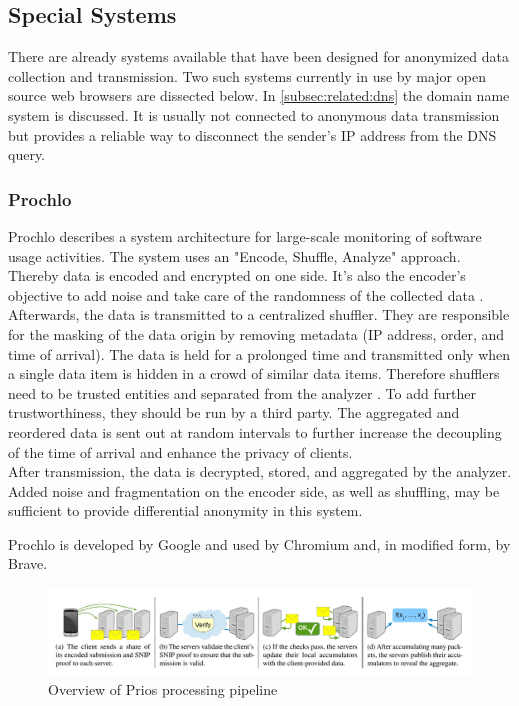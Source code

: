     \subsection{Special Systems}
        \label{subsec:related:special}
        There are already systems available that have been designed for anonymized data collection and transmission. 
        Two such systems currently in use by major open source web browsers are dissected below. In \ref{subsec:related:dns} the domain name system is discussed. It is usually not connected to anonymous data transmission but provides a reliable way to disconnect the sender's IP address from the DNS query.
        
    \subsubsection{Prochlo}
        Prochlo describes a system architecture for large-scale monitoring of software usage activities. The system uses an "Encode, Shuffle, Analyze" approach. Thereby data is encoded and encrypted on one side. It's also the encoder's objective to add noise and take care of the randomness of the collected data \cite{bittau_prochlo_2017}.\\
        Afterwards, the data is transmitted to a centralized shuffler. They are responsible for the masking of the data origin by removing metadata (IP address, order, and time of arrival).
        The data is held for a prolonged time and transmitted only when a single data item is hidden in a crowd of similar data items. Therefore shufflers need to be trusted entities and separated from the analyzer \cite{bittau_prochlo_2017}. To add further trustworthiness, they should be run by a third party. The aggregated and reordered data is sent out at random intervals to further increase the decoupling of the time of arrival and enhance the privacy of clients.\\
        After transmission, the data is decrypted, stored, and aggregated by the analyzer. 
        Added noise and fragmentation on the encoder side, as well as shuffling, may be sufficient to provide differential anonymity in this system.
        
        Prochlo is developed by Google and used by Chromium and, in modified form, by Brave.
        \begin{figure}[hb]
            \centering
            \includegraphics[width=\textwidth]{latex/figures/prio_overview.jpg}
            \caption[Overview of Prios processing pipeline]{Overview of Prios processing pipeline \cite{corrigan-gibbs_prio_2017}}
            \label{fig:prio_overview}
        \end{figure}
    
